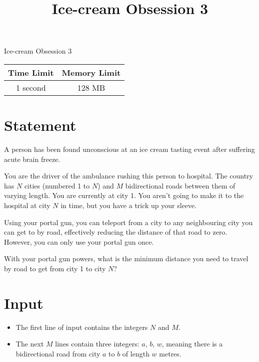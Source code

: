 \documentclass{article}
\begin{document}
\title{\vspace{-5ex}Ice-cream Obsession 3}
\author{\vspace{-5ex}}
\date{\vspace{-5ex}}
\pagestyle{fancy}
\fancyhf{}

\begin{center}
\huge{Ice-cream Obsession 3}\small\\
\vspace{5ex}
\begin{tabular}{|c|c|} 
\hline
Time Limit & Memory Limit \\
\hline
1 second & 128 MB \\

\hline
\end{tabular}
\end{center}
\section*{Statement}

A person has been found unconscious at an ice cream tasting event after suffering acute brain freeze.

You are the driver of the ambulance rushing this person to hospital. The country has $N$ cities (numbered 1 to $N$) and $M$ bidirectional roads between them of varying length. You are currently at city 1. You aren't going to make it to the hospital at city $N$ in time, but you have a trick up your sleeve.

Using your portal gun, you can teleport from a city to any neighbouring city you can get to by road, effectively reducing the distance of that road to zero. However, you can only use your portal gun once.

With your portal gun powers, what is the minimum distance you need to travel by road to get from city 1 to city $N$?

\section*{Input}

\begin{itemize}
\item The first line of input contains the integers $N$ and $M$.
\item The next $M$ lines contain three integers: $a$, $b$, $w$, meaning there is a bidirectional road from city $a$ to $b$ of length $w$ metres.
\end{itemize}
\end{document}
